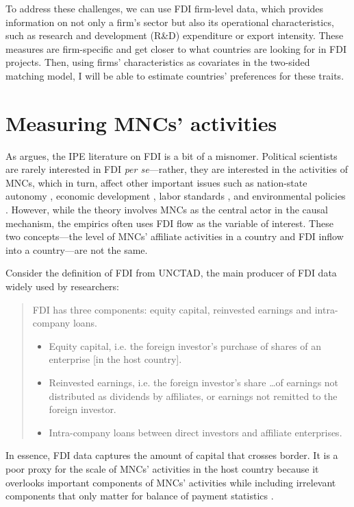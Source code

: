 To address these challenges, we can use FDI firm-level data, which provides
information on not only a firm's sector but also its operational
characteristics, such as research and development (R\&D) expenditure or export
intensity. These measures are firm-specific and get closer to what countries are
looking for in FDI projects. Then, using firms' characteristics as covariates in
the two-sided matching model, I will be able to estimate countries' preferences
for these traits.

\section{Measuring MNCs' activities}
\label{sec:measuring_mnc_activities}

As \citet{Kerner2014} argues, the IPE literature on FDI is a bit of a misnomer.
Political scientists are rarely interested in FDI \textit{per se}---rather, they
are interested in the activities of MNCs, which in turn, affect other important
issues such as nation-state autonomy \citep{Mosley2005}, economic development
\citep{Moran1998}, labor standards \citep{Mosley2007}, and environmental
policies \citep{Prakash2007}. However, while the theory involves MNCs as the
central actor in the causal mechanism, the empirics often uses FDI flow as the
variable of interest. These two concepts---the level of MNCs' affiliate
activities in a country and FDI inflow into a country---are not the same.

Consider the definition of FDI from UNCTAD, the main producer of FDI data widely
used by researchers:

\begin{quote} FDI has three components: equity capital, reinvested earnings and
  intra-company loans.
  \begin{itemize}
  \item Equity capital, i.e. the foreign investor’s purchase of shares of an
    enterprise [in the host country].
  \item Reinvested earnings, i.e. the foreign investor’s share \ldots of
    earnings not distributed as dividends by affiliates, or earnings not
    remitted to the foreign investor.
  \item Intra-company loans between direct investors and affiliate enterprises.
  \end{itemize} \citep[245]{UNCTAD2007}
\end{quote}

In essence, FDI data captures the amount of capital that crosses border. It is a
poor proxy for the scale of MNCs' activities in the host country because it
overlooks important components of MNCs' activities while including irrelevant
components that only matter for balance of payment statistics
\citep{Beugelsdijk2010}.

